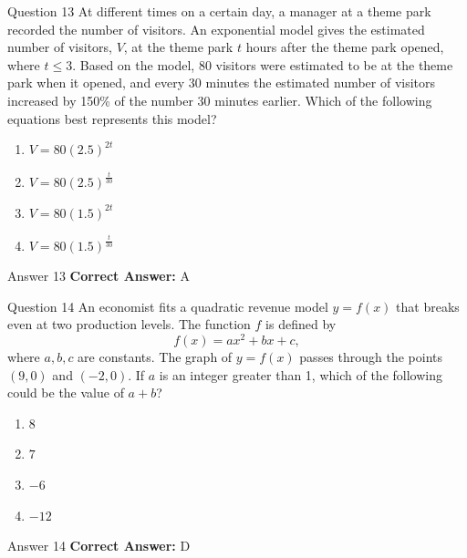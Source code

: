 \documentclass{beamer}
\begin{document}
\begin{frame}{Question 13}
\small
At different times on a certain day, a manager at a theme park recorded the number of visitors.  
An exponential model gives the estimated number of visitors, $V$, at the theme park $t$ hours after the theme park opened, where $t \leq 3$.  
Based on the model, 80 visitors were estimated to be at the theme park when it opened,  
and every 30 minutes the estimated number of visitors increased by 150\% of the number 30 minutes earlier.  
Which of the following equations best represents this model?
\vspace{0.35cm}
\begin{enumerate}
    \item[A.] $V = 80(2.5)^{2t}$
    \item[B.] $V = 80(2.5)^{\frac{t}{30}}$
    \item[C.] $V = 80(1.5)^{2t}$
    \item[D.] $V = 80(1.5)^{\frac{t}{30}}$
\end{enumerate}
\end{frame}
\begin{frame}{Answer 13}
\small
\textbf{Correct Answer:} A
\end{frame}

\begin{frame}{Question 14}
\small
An economist fits a quadratic revenue model \(y = f(x)\) that breaks even at two production levels. The function \(f\) is defined by
\[
f(x) = ax^2 + bx + c,
\]
where \(a, b, c\) are constants. The graph of \(y = f(x)\) passes through the points \((9, 0)\) and \((-2, 0)\). If \(a\) is an integer greater than 1, which of the following could be the value of \(a + b\)?
\vspace{0.35cm}
\begin{enumerate}
    \item[A.] \(8\)
    \item[B.] \(7\)
    \item[C.] \(-6\)
    \item[D.] \(-12\)
\end{enumerate}
\end{frame}
\begin{frame}{Answer 14}
\small
\textbf{Correct Answer:} D
\end{frame}
\end{document}
